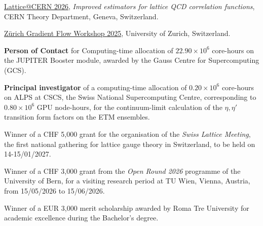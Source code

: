 
\begin{cvlist}
\item[06-17/07/2026] \href{https://indico.cern.ch/event/1616325/}{Lattice@CERN 2026}, \textit{Improved estimators for lattice QCD correlation functions},
CERN Theory Department, Geneva, Switzerland.
\item[12-14/02/2025] \href{https://indico.psi.ch/event/16749/}{Z\"urich Gradient Flow Workshop 2025},
University of Zurich, Switzerland.
\end{cvlist}


\begin{cvlist}
\item[2025 - 2026] \textbf{Person of Contact} for Computing-time allocation of $22.90\times10^{6}$ core-hours on the JUPITER Booster
module, awarded by the Gauss Centre for Supercomputing (GCS).

\item[2025 - 2026] \textbf{Principal investigator} of a computing-time allocation of $0.20\times10^{6}$
core-hours on ALPS at CSCS, the Swiss National Supercomputing Centre, corresponding to
$0.80\times10^{6}$ GPU node-hours, for the continuum-limit calculation of the $\eta,\eta'$ transition form
factors on the ETM ensembles.

\item[2026] Winner of a CHF 5{,}000 grant for the organisation of the \textit{Swiss Lattice Meeting}, the first
national gathering for lattice gauge theory in Switzerland, to be held on 14-15/01/2027.

\item[2026] Winner of a CHF 3{,}000 grant from the \textit{Open Round 2026} programme of the University of Bern,
for a visiting research period at TU Wien, Vienna, Austria, from 15/05/2026 to 15/06/2026.

\item[2013 - 2016] Winner of a EUR 3{,}000 merit scholarship awarded by Roma Tre University for academic
excellence during the Bachelor's degree.
\end{cvlist}


